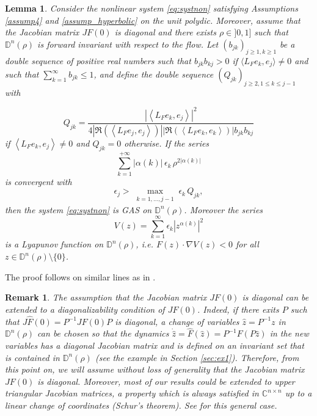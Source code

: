\documentclass{article}
\newtheorem{lemma}{Lemma}
\newtheorem{remark}{Remark}
\begin{document}
\begin{lemma}\label{lemma:principalresult}
Consider the nonlinear system \eqref{eq:systnon} satisfying Assumptions \ref{assump4} and \ref{assump_hyperbolic} on the unit polydic. Moreover, assume that the Jacobian matrix $JF(0)$ is diagonal and there exists $\rho\in ]0, 1]$ such that $\mathbb{D}^n\left(\rho \right)$ is forward invariant with respect to the flow.
Let $\left( b_{jk}\right)_{j\geq 1, k\geq 1}$ be a double sequence of positive real numbers such that $b_{jk}b_{kj}>0$ if $\langle L_{F} e_k,  e_j \rangle \neq 0$ and such that $\sum_{k=1}^\infty b_{jk}\leq 1$, and define the double sequence $\left( Q_{jk}\right)_{j\geq 2, 1\leq k\leq j-1}$ with

\begin{equation}
\label{eq:double_sequence}
    Q_{jk} = \dfrac{\left|\left\langle L_{F} e_k,  e_j \right\rangle \right|^2  }{4\left|\Re\left(\left\langle   L_{F} e_j, e_j \right\rangle\right)\right|\left|\Re\left(\left\langle L_{F} e_k,  e_k \right\rangle\right)\right| b_{jk}b_{kj}}
\end{equation}
if $\left\langle L_{F} e_k,  e_j \right\rangle \neq 0$ and $Q_{jk}=0$ otherwise.
If the series 
\begin{equation}\label{eq:conditionconvergence_bis}
\sum_{k=1}^{+\infty}|\alpha(k)|\,\epsilon_k\,\rho^{2|\alpha(k)|}
\end{equation}
is convergent with
\begin{equation}
\label{eq:defineepsilon}
\epsilon_j > \max_{\substack{ k=1,\dots, j-1}} \epsilon_k \, Q_{jk},
\end{equation}
then the system \eqref{eq:systnon} is GAS on $\mathbb{D}^n(\rho)$. Moreover the series 
 $$V(z)=\sum_{k=1}^\infty \epsilon_k \left\vert z ^{\alpha (k)}\right\vert^2$$
 is a Lyapunov function on $ \mathbb{D}^n(\rho)$, i.e. $F(z) \cdot \nabla V(z) <0$ for all $z\in \mathbb{D}^n(\rho) \setminus\{0\}$.
\end{lemma}

The proof follows on similar lines as in \cite{CMZAM2}.


\begin{remark}
The assumption that the Jacobian matrix $JF(0)$ is diagonal can be extended to a diagonalizability condition of $JF(0)$. Indeed, if there exits $P$ such that  $J\widehat{F}(0)=P^{-1}JF(0)P$ is diagonal, a change of variables $\widehat{z}=P^{-1}z$ in $\mathbb{D}^n(\rho)$ can be chosen so that the dynamics $\dot{\widehat{z}}=\widehat{F}(\widehat{z})=P^{-1}F(P\widehat{z})$ in the new variables has a diagonal Jacobian matrix and is defined on an invariant set that is contained in $\mathbb{D}^n(\rho)$ (see the example in Section \ref{sec:ex1}). Therefore, from this point on, we will assume without loss of generality that the Jacobian matrix $JF(0)$ is diagonal.
Moreover, most of our results could be extended to upper triangular Jacobian matrices, a property which is always satisfied in $\mathbb{C}^{n \times n}$ up to a linear change of coordinates (Schur's theorem). See \cite{CMZAM2} for this general case.

\end{remark}
  
\end{document}
